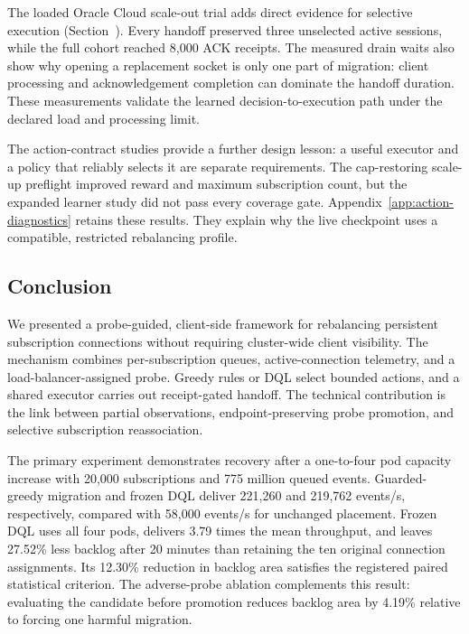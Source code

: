 The loaded Oracle Cloud scale-out trial adds direct evidence for selective
execution (Section~). Every handoff preserved three
unselected active sessions, while the full cohort reached 8,000 ACK receipts.
The measured drain waits also show why opening a replacement socket is only
one part of migration: client processing and acknowledgement completion can
dominate the handoff duration. These measurements validate the learned
decision-to-execution path under the declared load and processing limit.

The action-contract studies provide a further design lesson: a useful
executor and a policy that reliably selects it are separate requirements.
The cap-restoring scale-up preflight improved reward and maximum subscription
count, but the expanded learner study did not pass every coverage gate.
Appendix~\ref{app:action-diagnostics} retains these results. They explain why
the live checkpoint uses a compatible, restricted rebalancing profile.

\subsection{Conclusion}

We presented a probe-guided, client-side framework for rebalancing
persistent subscription connections without requiring cluster-wide client
visibility.  The mechanism combines per-subscription queues, active-connection
telemetry, and a load-balancer-assigned probe. Greedy rules or DQL select
bounded actions, and a shared executor carries out receipt-gated handoff.
The technical contribution is the link between partial observations,
endpoint-preserving probe promotion, and selective subscription reassociation.

The primary experiment demonstrates recovery after a one-to-four pod capacity
increase with 20,000 subscriptions and 775 million queued events. Guarded-greedy
migration and frozen DQL deliver 221,260 and 219,762 events/s, respectively,
compared with 58,000 events/s for unchanged placement. Frozen DQL
uses all four pods, delivers 3.79 times the mean throughput, and leaves 27.52\%
less backlog after 20 minutes than retaining the ten original connection
assignments. Its 12.30\% reduction in backlog area satisfies the registered
paired statistical criterion. The adverse-probe ablation complements this
result: evaluating the candidate before promotion reduces backlog area by
4.19\% relative to forcing one harmful migration.

